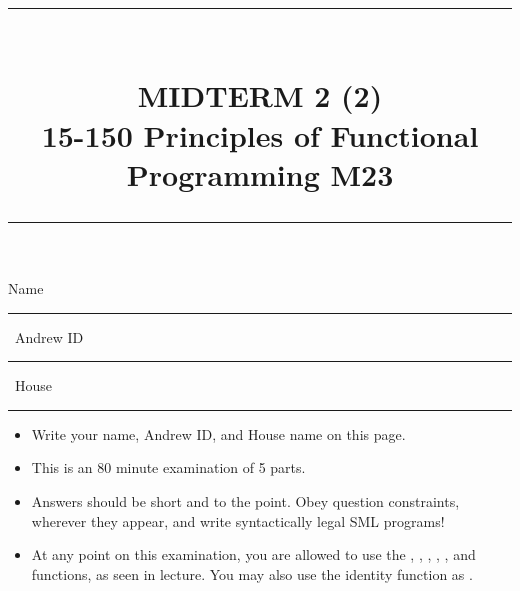 \documentclass[addpoints,12pt]{exam}
\newcommand{\HRule}[1]{\rule{\linewidth}{#1}}
\begin{document}
\pagestyle{fancy}
\fancyhead{} %
\fancyfoot[C]{\thepage} %


\setlength{\droptitle}{-8em}   %

\title{ \normalsize \textsc{}
		\HRule{1.5pt} \\
		\large \textbf{
      \uppercase{Midterm 2 (2)} \\
      15-150 Principles of Functional Programming M23} \\
    \HRule{1.5pt}
    \date{}
}

\maketitle

\vspace{-3cm}

\hspace{-1cm} Name \rule{5cm}{0.4pt} \, Andrew ID \rule{3cm}{0.4pt} \, House \rule{3.5cm}{0.4pt}

\vspace{5pt}

\begin{itemize}
  \item Write your name, Andrew ID, and House name on this page.
  \item This is an 80 minute examination of 5 parts.
  \item Answers should be short and to the point. Obey question constraints, wherever
  they appear, and write syntactically legal SML programs!
  \item At any point on this examination, you are allowed to use the ,
  , , , , and  functions,
  as seen in lecture. You may also use the identity function as .
\end{itemize}
\vspace{\fill}

{\small
\vqword{}
\begin{center}
\gradetable[v][questions]
\end{center}
}
\end{document}
